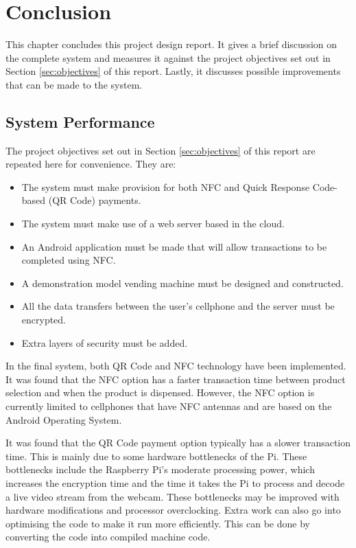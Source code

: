 \chapter{Conclusion}
\label{chap:7}

This chapter concludes this project design report. It gives a brief discussion on the
complete system and measures it against the project objectives set out in Section
\ref{sec:objectives} of this report. Lastly, it discusses possible improvements that can
be made to the system. 

\section{System Performance}

The project objectives set out in Section \ref{sec:objectives} of this report are repeated
here for convenience. They are:

\begin{itemize}
  \item The system must make provision for both NFC and Quick Response Code-based (QR
  Code) payments.
  \item The system must make use of a web server based in the cloud.
  \item An Android application must be made that will allow transactions to be completed
  using NFC.
  \item A demonstration model vending machine must be designed and constructed.
  \item All the data transfers between the user's cellphone and the server must be
  encrypted.
  \item Extra layers of security must be added. 
\end{itemize}

In the final system, both QR Code and NFC technology have been implemented. It was found
that the NFC option has a faster transaction time between product selection and
when the product is dispensed.
However, the NFC option is currently limited to cellphones that have NFC antennas and are
based on the Android Operating System.

It was found that the QR Code payment option typically has a slower transaction time. This
is mainly due to some hardware bottlenecks of the Pi. These bottlenecks include the
Raspberry Pi's moderate processing power, which increases the encryption time and the
time it takes the Pi to process and decode a live video stream from the webcam. These
bottlenecks may be improved with hardware modifications and processor overclocking. Extra
work can also go into optimising the code to make it run more efficiently. This can be
done by converting the code into compiled machine code.

